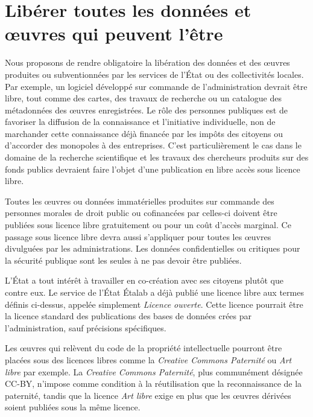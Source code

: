 \section{Libérer toutes les données et œuvres qui peuvent l'être}
Nous proposons de rendre obligatoire la libération des données et des œuvres produites ou subventionnées par les services de l’État ou des collectivités locales. Par exemple, un logiciel développé sur commande de l’administration devrait être libre, tout comme des cartes, des travaux de recherche ou un catalogue des métadonnées des œuvres enregistrées. Le rôle des personnes publiques est de favoriser la diffusion de la connaissance et l’initiative individuelle, non de marchander cette connaissance déjà financée par les impôts des citoyens ou d’accorder des monopoles à des entreprises. C'est particulièrement le cas dans le domaine de la recherche scientifique et les travaux des chercheurs produits sur des fonds publics devraient faire l'objet d'une publication en libre accès sous licence libre.

\begin{mesure}
Toutes les œuvres ou données immatérielles produites sur commande des personnes morales de droit public ou cofinancées par celles-ci doivent être publiées sous licence libre gratuitement ou pour un coût d'accès marginal. Ce passage sous licence libre devra aussi s'appliquer pour toutes les œuvres divulguées par les administrations. Les données confidentielles ou critiques pour la sécurité publique sont les seules à ne pas devoir être publiées.
\end{mesure}

L'État a tout intérêt à travailler en co-création avec ses citoyens plutôt que contre eux. Le service de l'État Étalab a déjà publié une licence libre aux termes définis ci-dessus, appelée simplement \textit{Licence ouverte}. Cette licence pourrait être la licence standard des publications des bases de données crées par l'administration, sauf précisions spécifiques. 

Les œuvres qui relèvent du code de la propriété intellectuelle pourront être placées sous des licences libres comme la \textit{Creative Commons Paternité} ou \textit{Art libre} par exemple. La \textit{Creative Commons Paternité}, plus communément désignée CC-BY, n'impose comme condition à la réutilisation que la reconnaissance de la paternité, tandis que la licence \textit{Art libre} exige en plus que les œuvres dérivées soient publiées sous la même licence.

